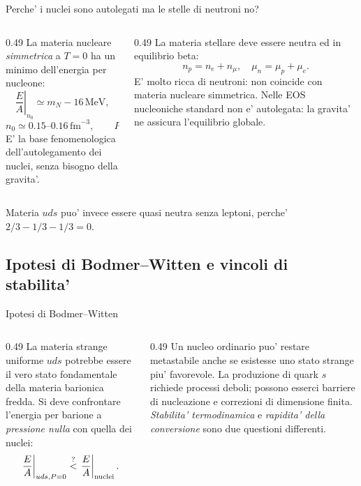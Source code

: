 \begin{frame}{Perche' i nuclei sono autolegati ma le stelle di neutroni no?}
\footnotesize
\begin{columns}[T,onlytextwidth]
\begin{column}{0.49\textwidth}
La materia nucleare \emph{simmetrica} a $T=0$
ha un minimo dell'energia per nucleone:
\[
\left.\frac EA\right|_{n_0}
\simeq m_N-16\,\mathrm{MeV},
\]
\[
n_0\simeq0.15\text{--}0.16\,\mathrm{fm}^{-3},
\qquad P(n_0)=0.
\]
E' la base fenomenologica dell'autolegamento
dei nuclei, senza bisogno della gravita'.
\end{column}
\begin{column}{0.49\textwidth}
La materia stellare deve essere
neutra ed in equilibrio beta:
\[
n_p=n_e+n_\mu,
\quad\mu_n=\mu_p+\mu_e.
\]
E' molto ricca di neutroni: non coincide
con materia nucleare simmetrica.
\medskip
Nelle EOS nucleoniche standard non e'
autolegata: la gravita' ne assicura
l'equilibrio globale.
\end{column}
\end{columns}
\medskip
Materia $uds$ puo' invece essere quasi neutra senza leptoni,
perche' $2/3-1/3-1/3=0$.
\end{frame}

\subsection{Ipotesi di Bodmer--Witten e vincoli di stabilita'}

\begin{frame}{Ipotesi di Bodmer--Witten}
\small
\begin{columns}[T,onlytextwidth]
\begin{column}{0.49\textwidth}
La materia strange uniforme $uds$
potrebbe essere il vero stato fondamentale
della materia barionica fredda.
\medskip
Si deve confrontare l'energia per barione
a \emph{pressione nulla} con quella dei nuclei:
\[
\left.\frac EA\right|_{uds,P=0}
\stackrel{?}{<}
\left.\frac EA\right|_{\rm nuclei}.
\]
\end{column}
\begin{column}{0.49\textwidth}
Un nucleo ordinario puo' restare
metastabile anche se esistesse
uno stato strange piu' favorevole.
\medskip
La produzione di quark $s$ richiede
processi deboli; possono esserci
barriere di nucleazione e correzioni
di dimensione finita.
\medskip
\textit{Stabilita' termodinamica} e
\textit{rapidita' della conversione} sono
due questioni differenti.
\end{column}
\end{columns}
\end{frame}

